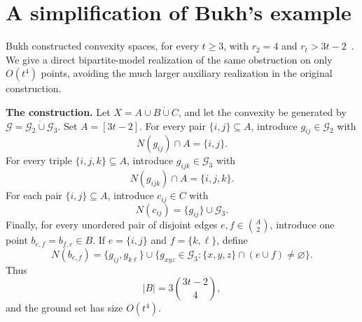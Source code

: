 \documentclass[11pt]{article}
\theoremstyle{definition}
\newcommand{\G}{\mathcal{G}}
\begin{document}
\section{A simplification of Bukh's example}\label{sec:Bukh}

Bukh constructed convexity spaces, for every $t\ge3$, with $r_2=4$ and $r_t>3t-2$~\cite{bukh2010radon}. We give a direct bipartite-model realization of the same obstruction on only $O(t^4)$ points, avoiding the much larger auxiliary realization in the original construction.

\medskip
\noindent\textbf{The construction.}
Let $X=A\mathbin{\dot\cup}B\mathbin{\dot\cup}C$, and let the convexity be generated by $\G=\G_2\mathbin{\dot\cup}\G_3$.
Set $A=[3t-2]$. For every pair $\{i,j\}\subseteq A$, introduce $g_{ij}\in\G_2$ with
\[
N(g_{ij})\cap A=\{i,j\}.
\]
For every triple $\{i,j,k\}\subseteq A$, introduce $g_{ijk}\in\G_3$ with
\[
N(g_{ijk})\cap A=\{i,j,k\}.
\]
For each pair $\{i,j\}\subseteq A$, introduce $c_{ij}\in C$ with
\[
N(c_{ij})=\{g_{ij}\}\cup\G_3.
\]
Finally, for every unordered pair of disjoint edges $e,f\in\binom A2$, introduce one point $b_{e,f}=b_{f,e}\in B$. If $e=\{i,j\}$ and $f=\{k,\ell\}$, define
\[
N(b_{e,f})=\{g_{ij},g_{k\ell}\}\cup
\{g_{xyz}\in\G_3:\{x,y,z\}\cap(e\cup f)\ne\varnothing\}.
\]
Thus
\[
|B|=3\binom{3t-2}{4},
\]
and the ground set has size $O(t^4)$.
\end{document}
